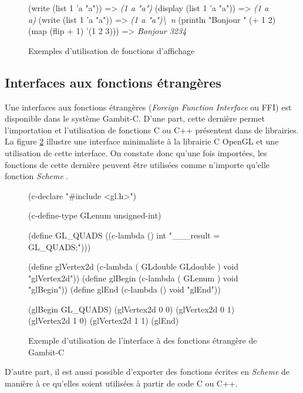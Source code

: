 \documentclass[12pt,twoside,letterpaper,francais]{book}
\newcommand{\Schemelang}{{\textit{Scheme }}}
\newcommand{\schemeresult}[1]{{\it #1}}
\begin{document}
\begin{figure}[htb!]
  \begin{schemecode}
(write (list 1 'a "a")) => \schemeresult{(1 a "a")} (display (list 1
    'a "a")) => \schemeresult{(1 a a)} (write (list 1 'a "a")) =>
    \schemeresult{(1 a "a")\textbackslash~n} (println "Bonjour " (+ 1
    2) (map (flip + 1) '(1 2 3))) => \schemeresult{Bonjour 3234}
  \end{schemecode}
  \caption{Exemples d'utilisation de fonctions d'affichage}
  \label{Scheme:print}
\end{figure}


\FloatBarrier
\subsection{Interfaces aux fonctions étrangères}
Une interfaces aux fonctions étrangères (\textit{Foreign Function
  Interface} ou FFI) est disponible dans le système Gambit-C. D'une
part, cette dernière permet l'importation et l'utilisation de
fonctions C ou C++ présentent dans de librairies. La figure
\ref{Scheme:FFI} illustre une interface minimaliste à la librairie C
OpenGL et une utilisation de cette interface. On constate donc qu'une
fois importées, les fonctions de cette dernière peuvent être utilisées
comme n'importe qu'elle fonction \Schemelang.

\begin{figure}[htb!]
  \begin{schemecode}
(c-declare "\#include <gl.h>")

(c-define-type GLenum unsigned-int)

(define GL\_QUADS ((c-lambda () int "\_\_\_result = GL\_QUADS;")))

(define glVertex2d (c-lambda ( GLdouble GLdouble ) void "glVertex2d"))
(define glBegin (c-lambda ( GLenum ) void "glBegin"))
(define glEnd (c-lambda () void "glEnd"))

(glBegin GL\_QUADS)
(glVertex2d 0 0) (glVertex2d 0 1)
(glVertex2d 1 0) (glVertex2d 1 1)
(glEnd)
  \end{schemecode}
  \caption{Exemple d'utilisation de l'interface à des fonctions
    étrangère de Gambit-C}
  \label{Scheme:FFI}
\end{figure}

D'autre part, il est aussi possible d'exporter des fonctions écrites
en \Schemelang de manière à ce qu'elles soient utilisées à partir de code C
ou C++.


\FloatBarrier
\end{document}
